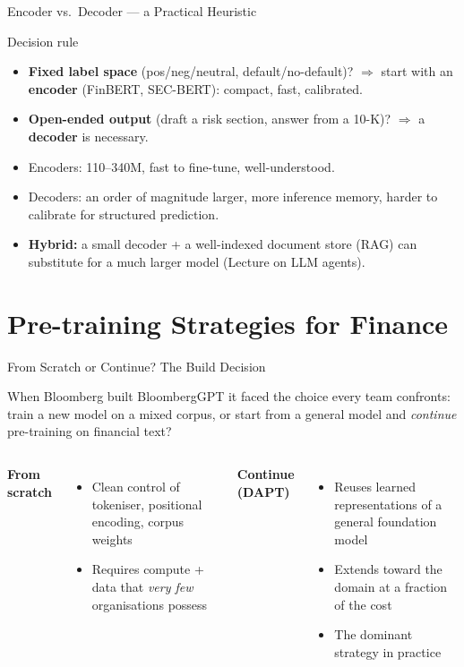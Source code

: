\documentclass[9pt,t]{beamer}
\begin{document}
\begin{frame}{Encoder vs.\ Decoder --- a Practical Heuristic}
\begin{block}{Decision rule}
\begin{itemize}
  \item \textbf{Fixed label space} (pos/neg/neutral, default/no-default)?
        $\Rightarrow$ start with an \textbf{encoder} (FinBERT, SEC-BERT): compact,
        fast, calibrated.
  \item \textbf{Open-ended output} (draft a risk section, answer from a 10-K)?
        $\Rightarrow$ a \textbf{decoder} is necessary.
\end{itemize}
\end{block}

\medskip
\begin{itemize}
  \item Encoders: 110--340M, fast to fine-tune, well-understood.
  \item Decoders: an order of magnitude larger, more inference memory, harder to
        calibrate for structured prediction.
  \item \textbf{Hybrid:} a small decoder + a well-indexed document store (RAG) can
        substitute for a much larger model (Lecture on LLM agents).
\end{itemize}
\end{frame}

\section{Pre-training Strategies for Finance}

\begin{frame}{From Scratch or Continue? The Build Decision}
\begin{bigpicture}
When Bloomberg built BloombergGPT it faced the choice every team confronts: train
a new model on a mixed corpus, or start from a general model and \emph{continue}
pre-training on financial text?
\end{bigpicture}

\medskip
\begin{columns}[T]
\textbf{From scratch}
\begin{itemize}
  \item Clean control of tokeniser, positional encoding, corpus weights
  \item Requires compute + data that \emph{very few} organisations possess
\end{itemize}
\textbf{Continue (DAPT)}
\begin{itemize}
  \item Reuses learned representations of a general foundation model
  \item Extends toward the domain at a fraction of the cost
  \item The dominant strategy in practice
\end{itemize}
\end{columns}
\end{frame}
\end{document}
